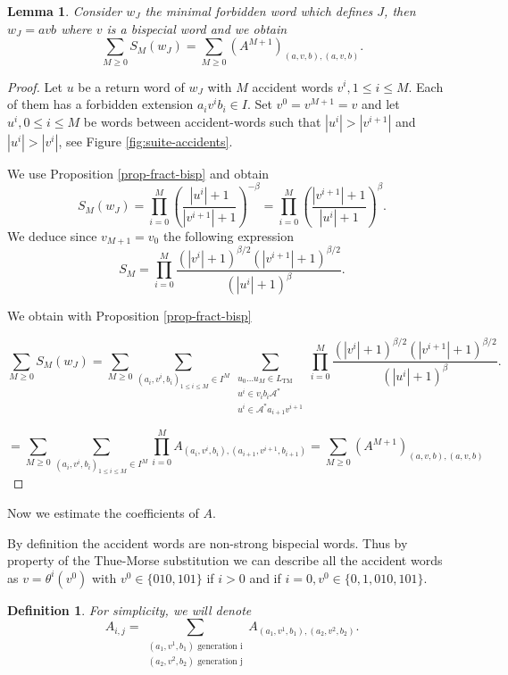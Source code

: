 \documentclass[11 pt]{article}
\newtheorem{lemma}[proposition]{Lemma}
\newtheorem{definition}[proposition]{Definition}
\theoremstyle{definition}
\begin{document}
\begin{lemma}\label{lem-maj-Sm}
Consider $w_J$ the minimal forbidden word which defines $J$, then $w_J=avb$ where $v$ is a bispecial word and we obtain
$$\sum_{M\geq 0}S_M(w_J)=\sum_{M\geq 0}(A^{M+1})_{(a,v,b),(a,v,b)}.$$
\end{lemma}
\begin{proof}
Let $u$ be a return word of $w_J$ with $M$ accident words $v^i, 1\leq i\leq M$. Each of them has a forbidden extension $a_iv^ib_i\in I$. Set $v^0=v^{M+1}=v$  and let $u^i, 0\leq i\leq M$ be words between accident-words such that $|u^i|>|v^{i+1}|$ and $|u^i|>|v^i|$, see Figure \ref{fig:suite-accidents}.




We use Proposition \ref{prop-fract-bisp} and obtain
$$S_M(w_J)=\prod_{i=0}^M(\frac{|u^i|+1}{|v^{i+1}|+1})^{-\beta}=\prod_{i=0}^M(\frac{|v^{i+1}|+1}{|u^i|+1})^{\beta}.$$
We deduce since $v_{M+1}=v_0$ the following expression
$$S_M=\prod_{i=0}^M \frac{(|v^i|+1)^{\beta/2}(|v^{i+1}|+1)^{\beta/2}}{(|u^i|+1)^\beta}.$$

We obtain with Proposition \ref{prop-fract-bisp}

$$\sum_{M\geq 0} S_M(w_J)=\sum_{M\geq 0}\displaystyle\sum_{(a_i,v^i,b_i)_{1\leq i\leq M}\in I^M}\sum_{\substack{u_0\dots u_M\in L_{\mathrm{TM}}\\ u^i\in v_ib_i\mathcal{A}^*\\ u^i\in \mathcal{A}^*a_{i+1}v^{i+1}}}\prod_{i=0}^M\frac{(|v^i|+1)^{\beta/2}(|v^{i+1}|+1)^{\beta/2}}{(|u^i|+1)^\beta}.
$$


$$=\sum_{M\geq 0}\sum_{(a_i,v^i,b_i)_{1\leq i\leq M}\in I^M}\prod_{i=0}^MA_{(a_i,v^i,b_i),(a_{i+1},v^{i+1},b_{i+1})}=\sum_{M\geq 0} (A^{M+1})_{(a,v,b), (a,v,b)}$$
\end{proof}

Now we estimate the coefficients of $A$.

By definition the accident words are non-strong bispecial words. Thus by property of the Thue-Morse substitution we can describe all the accident words as $v=\theta^{i}(v^0)$ with $v^0\in\{010,101\}$ if $i>0$ and if $i=0, v^0\in\{0,1, 010, 101\}$.

\begin{definition}
For simplicity, we will denote 
$$A_{i,j}=\sum_{\substack{(a_1,v^1,b_1) \text{ generation i}\\(a_2,v^2,b_2) \text{ generation j} }}A_{(a_1,v^1,b_1), (a_2,v^2,b_2)}.$$
\end{definition}
\end{document}
